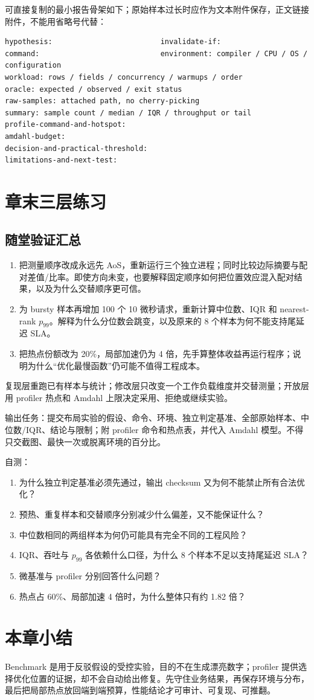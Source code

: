 可直接复制的最小报告骨架如下；原始样本过长时应作为文本附件保存，正文链接附件，不能用省略号代替：

\begin{lstlisting}[numbers=none]
hypothesis:                         invalidate-if:
command:                            environment: compiler / CPU / OS / configuration
workload: rows / fields / concurrency / warmups / order
oracle: expected / observed / exit status
raw-samples: attached path, no cherry-picking
summary: sample count / median / IQR / throughput or tail
profile-command-and-hotspot:
amdahl-budget:
decision-and-practical-threshold:
limitations-and-next-test:
\end{lstlisting}

\newpage
\section{章末三层练习}

\subsection*{随堂验证汇总}

\begin{enumerate}
  \item 把测量顺序改成永远先 AoS，重新运行三个独立进程；同时比较边际摘要与配对差值/比率。即使方向未变，也要解释固定顺序如何把位置效应混入配对结果，以及为什么交替顺序更可信。
  \item 为 bursty 样本再增加 100 个 10 微秒请求，重新计算中位数、IQR 和 nearest-rank $p_{99}$。解释为什么分位数会跳变，以及原来的 8 个样本为何不能支持尾延迟 SLA。
  \item 把热点份额改为 20\%，局部加速仍为 4 倍，先手算整体收益再运行程序；说明为什么“优化最慢函数”仍可能不值得工程成本。
\end{enumerate}

复现层重跑已有样本与统计；修改层只改变一个工作负载维度并交替测量；开放层用 profiler 热点和 Amdahl 上限决定采用、拒绝或继续实验。

输出任务：提交布局实验的假设、命令、环境、独立判定基准、全部原始样本、中位数/IQR、结论与限制；附 profiler 命令和热点表，并代入 Amdahl 模型。不得只交截图、最快一次或脱离环境的百分比。

自测：
\begin{enumerate}
  \item 为什么独立判定基准必须先通过，输出 checksum 又为何不能禁止所有合法优化？
  \item 预热、重复样本和交替顺序分别减少什么偏差，又不能保证什么？
  \item 中位数相同的两组样本为何仍可能具有完全不同的工程风险？
  \item IQR、吞吐与 $p_{99}$ 各依赖什么口径，为什么 8 个样本不足以支持尾延迟 SLA？
  \item 微基准与 profiler 分别回答什么问题？
  \item 热点占 60\%、局部加速 4 倍时，为什么整体只有约 1.82 倍？
\end{enumerate}


\section{本章小结}

Benchmark 是用于反驳假设的受控实验，目的不在生成漂亮数字；profiler 提供选择优化位置的证据，却不会自动给出修复。先守住业务结果，再保存环境与分布，最后把局部热点放回端到端预算，性能结论才可审计、可复现、可推翻。
